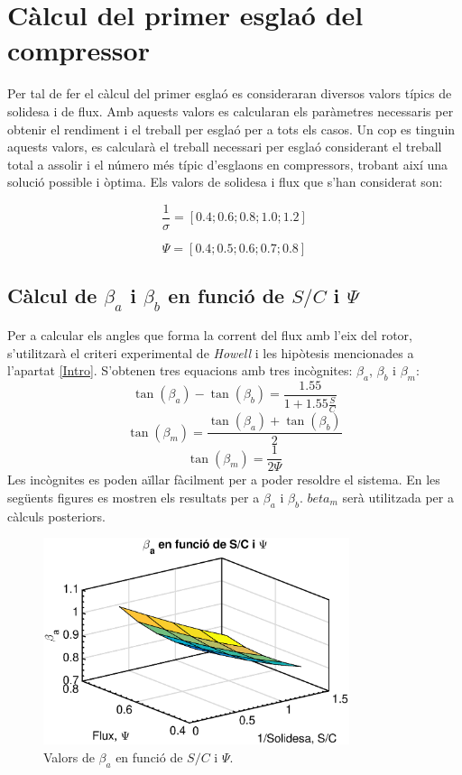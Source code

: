 \section{Càlcul del primer esglaó del compressor}
Per tal de fer el càlcul del primer esglaó es consideraran diversos valors típics de solidesa i de flux. Amb aquests valors es calcularan els paràmetres necessaris per obtenir el rendiment i el treball per esglaó per a tots els casos. Un cop es tinguin aquests valors, es calcularà el treball necessari per esglaó considerant el treball total a assolir i el número més típic d'esglaons en compressors, trobant així una solució possible i òptima. 
Els valors de solidesa i flux que s'han considerat son:

\begin{equation}
\nonumber \frac{1}{\sigma}=[0.4; 0.6; 0.8; 1.0; 1.2]
\end{equation}
 
\begin{equation}
\nonumber \Psi=[0.4;0.5;0.6;0.7;0.8]
\end{equation}
\subsection{Càlcul de $\beta_a$ i $\beta_b$ en funció de $S/C$ i $\Psi$}
Per a calcular els angles que forma la corrent del flux amb l'eix del rotor, s'utilitzarà el criteri experimental de \textit{Howell} i les hipòtesis mencionades a l'apartat \ref{Intro}. S'obtenen tres equacions amb tres incògnites: $\beta_a$, $\beta_b$ i $\beta_m$: 
\begin{equation}
\tan(\beta_a)-\tan(\beta_b)=\frac{1.55}{1+1.55\frac{S}{C}}
\end{equation} 
\begin{equation}
\tan(\beta_m)=\frac{\tan(\beta_a)+\tan(\beta_b)}{2}
\end{equation}
\begin{equation}
\tan(\beta_m)=\frac{1}{2\Psi}
\end{equation}
Les incògnites es poden aïllar fàcilment per a poder resoldre el sistema. En les següents figures es mostren els resultats per a $\beta_a$ i $\beta_b$. $beta_m$ serà utilitzada per a càlculs posteriors.
\begin{figure}[H]
	\centering
	\includegraphics[width=0.8\textwidth]{./code/figures/parametres/betA}
	\caption{Valors de $\beta_a$ en funció de $S/C$ i $\Psi$.}
	\label{betA}
\end{figure}

